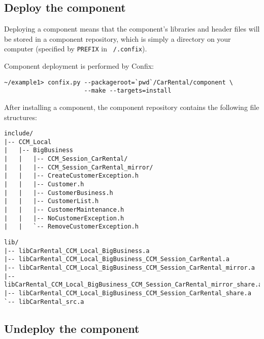 \subsection{Deploy the component}

Deploying a component means that the component's libraries and header files 
will be stored in a component repository, which is simply a directory on your 
computer (specified by {\tt PREFIX} in {\tt ~/.confix}).

Component deployment is performed by Confix:
\begin{small}
\begin{verbatim}
~/example1> confix.py --packageroot=`pwd`/CarRental/component \
                      --make --targets=install
\end{verbatim}
\end{small}

After installing a component, the component repository contains the following
file structures:
\begin{small}
\begin{verbatim}
include/
|-- CCM_Local
|   |-- BigBusiness
|   |   |-- CCM_Session_CarRental/
|   |   |-- CCM_Session_CarRental_mirror/
|   |   |-- CreateCustomerException.h
|   |   |-- Customer.h
|   |   |-- CustomerBusiness.h
|   |   |-- CustomerList.h
|   |   |-- CustomerMaintenance.h
|   |   |-- NoCustomerException.h
|   |   `-- RemoveCustomerException.h
\end{verbatim}
\end{small}

\begin{small}
\begin{verbatim}
lib/
|-- libCarRental_CCM_Local_BigBusiness.a
|-- libCarRental_CCM_Local_BigBusiness_CCM_Session_CarRental.a
|-- libCarRental_CCM_Local_BigBusiness_CCM_Session_CarRental_mirror.a
|-- libCarRental_CCM_Local_BigBusiness_CCM_Session_CarRental_mirror_share.a
|-- libCarRental_CCM_Local_BigBusiness_CCM_Session_CarRental_share.a
`-- libCarRental_src.a
\end{verbatim}
\end{small}




\subsection{Undeploy the component}

